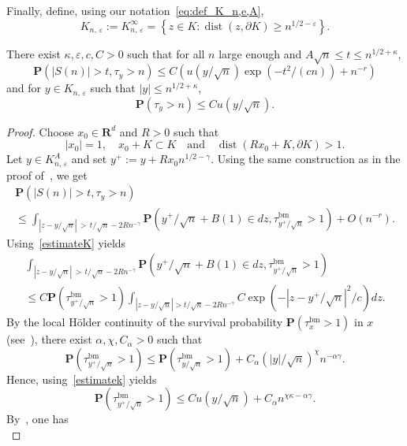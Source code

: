 \documentclass[AHL,Unicode,longabstracts,published]{cedram}
\DeclareMathOperator{\bm}{bm}
\DeclareMathOperator{\dist}{dist}
\newcommand{\pr}{\mathbf{P}}
\newcommand{\bfR}{\mathbf{R}}
\renewcommand{\epsilon}{\varepsilon}
\renewcommand{\leq}{\leqslant}
\renewcommand{\geq}{\geqslant}
\begin{document}
Finally, define, using our notation~\eqref{eq:def_K_n,e,A},
\[
K_{n,\,\epsilon}:=K_{n,\,\epsilon}^{\infty}=\left\{z\in K: \dist\left(z,\partial K\right)\geq n^{1/2-\epsilon}\right\}.
\]

\begin{lemm}\label{distribution_large_range}
There exist $\kappa,\epsilon,c,C>0$ such that for all $n$ large enough and $A\sqrt{n}\leq t\leq n^{1/2+\kappa}$,
\[
\pr\left(|S(n)|>t,\tau_{y}>n\right)\leq C\left(u\left(y/\sqrt{n}\right)\exp\left(-t^{2}/(cn)\right)+n^{-r}\right)
\]
and for $y\in{K}_{n,\,\epsilon}$ such that $| y|\leq n^{1/2+\kappa}$,
\[
\pr\left(\tau_{y}>n\right)\leq Cu\left(y/\sqrt{n}\right).
\]
\end{lemm}


\begin{proof}
Choose $x_{0}\in\bfR^{d}$ and $R>0$ such that
\[
|x_{0}| =1,\quad x_{0}+{K}\subset {K}\quad \text{and}\quad \dist\left(Rx_{0}+{K}, \partial{K}\right)>1.
\]
Let $y\in {K}_{n,\,\epsilon}^{A}$ and set $y^{+}:=y+ Rx_{0}n^{1/2-\gamma}$. Using the same construction as in the proof of~\cite[Lemma~20]{DeWa-15}, we get
\begin{multline*}
\pr\left(|S(n)|>t,\tau_{y}>n\right)\\
\leq \int_{\left|z-y/\sqrt{n}\right|\,>\,t/\sqrt{n}-2Rn^{-\gamma}}\pr\left(y^{+}/\sqrt{n}+B(1)\in dz,\tau_{y^{+}/\sqrt{n}}^{\bm}>1\right)+O\left(n^{-r}\right).
\end{multline*}
Using~\eqref{estimateK} yields
\begin{multline}\label{first_bound_probability_away}
\int_{\left|z-y/\sqrt{n}\right|\,>\,t/\sqrt{n}-2Rn^{-\gamma}}\pr\left(y^{+}/\sqrt{n}+B(1)\in dz,\tau^{\bm}_{y^{+}/\sqrt{n}}>1\right)\\
\leq C\pr\left(\tau^{\bm}_{y^{+}/\sqrt{n}}>1\right)\int_{\left|z-y/\sqrt{n}\right|>t/\sqrt{n}-2Rn^{-\gamma}}C\exp\left(-\left|z-y^{+}/\sqrt{n}\right|^{2}/c\right)dz.
\end{multline}
By the local H\"older continuity of the survival probability $\pr(\tau_{x}^{\bm}>1)$ in $x$ (see~\cite[Proposition~A.1]{RaTa-20}), there exist $\alpha,\chi,C_{\alpha}>0$ such that
\[
\pr\left(\tau^{\bm}_{y^{+}/\sqrt{n}}>1\right)\leq \pr\left(\tau^{\bm}_{y/\sqrt{n}}>1\right)+C_{\alpha}\left(|y|/\sqrt{n}\right)^{\chi}n^{-\alpha\gamma}.
\]
Hence, using~\eqref{estimatek} yields
\[
\pr\left(\tau^{\bm}_{y^{+}/\sqrt{n}}>1\right)\leq Cu(y/\sqrt{n})+C_{\alpha}n^{\chi\kappa-\alpha\gamma}.
\]
By~\cite[Lemma~19]{DeWa-15}, one has
\begin{equation}\label{lowerBoundu}

\end{equation}
\end{proof}
\end{document}
